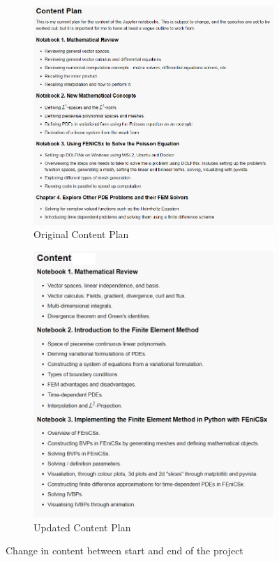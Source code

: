 \begin{figure}[H]
\centering
\begin{subfigure}{.5\textwidth}
  \centering
  \includegraphics[scale=0.4]{./images/misc/og_content_plan}
  \caption{Original Content Plan} \label{fig:og-content-plan}
\end{subfigure}%
\begin{subfigure}{.5\textwidth}
  \centering
  \includegraphics[scale=0.4]{./images/misc/new_content_plan}
  \caption{Updated Content Plan} \label{fig:new-content-plan}
\end{subfigure}
\caption{Change in content between start and end of the project}
\label{fig:test}
\end{figure}

